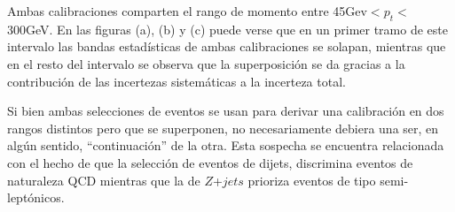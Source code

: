 Ambas calibraciones comparten el rango de momento entre 45Gev$<p_t<$300GeV. En las figuras (a), (b) y (c) puede verse que en un primer tramo de este intervalo las bandas estadísticas de ambas calibraciones se solapan, mientras que en el resto del intervalo se observa que la superposición se da gracias a la contribución de las incertezas sistemáticas a la incerteza total. 

Si bien ambas selecciones de eventos se usan para derivar una calibración en dos rangos distintos pero que se superponen, no necesariamente debiera una ser, en algún sentido, ``continuación'' de la otra. Esta sospecha se encuentra relacionada con el hecho de que la selección de eventos de dijets, discrimina eventos de naturaleza QCD mientras que la de $Z$+$jets$ prioriza eventos de tipo semi-leptónicos.




